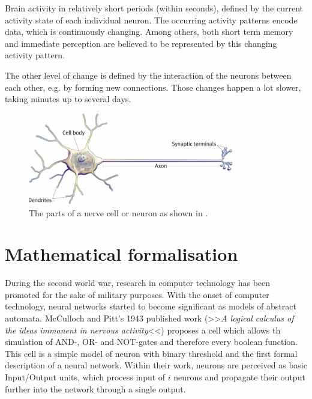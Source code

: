 \documentclass[10pt,a4paper,DIV=11]{scrreprt}
\begin{document}
Brain activity in relatively short periods (within seconds), defined by the current activity state of each individual neuron. The occurring 
activity patterns encode data, which is continuously changing. Among others, both short term memory and immediate perception are believed to be 
represented by this changing activity pattern.

The other level of change is defined by the interaction of the neurons between each other, e.g. by forming new connections. Those changes happen 
a lot slower, taking minutes up to several days.\cite{NEUINF} 

\begin{center}
\begin{figure}[H]

\includegraphics[width=0.8\textwidth,scale=1]{files/neuron.jpg}  
\caption{The parts of a nerve cell or neuron as shown in \cite{NEU}.}
\label{fig:neuron}
\end{figure}
\end{center}


\section{Mathematical formalisation}\label{sec:mcpitts}
During the second world war, research in computer technology has been promoted for the sake of military purposes. With the onset of computer 
technology, neural networks started to become significant as models of abstract automata. McCulloch and Pitt's 1943 published work 
(>>\textit{A logical calculus of the ideas immanent in nervous activity}<<) proposes a cell which allows th simulation of AND-, OR- and NOT-gates 
and therefore every boolean function. This cell is a simple model of neuron with binary threshold and the first formal description of a 
neural network. Within their work, neurons are perceived as basic Input/Output units, which process input of $i$ neurons and propagate their 
output further into the network through a single output.\\
\end{document}
